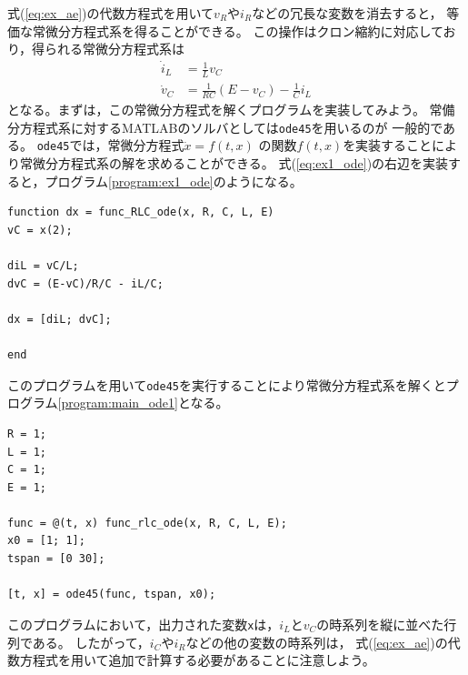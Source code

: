 \documentclass[tombow,dvipdfmx]{corona-a5-1.1}
\begin{document}
{\begin{例}[簡単な微分代数方程式の数値解法]
式(\ref{eq:ex_ae})の代数方程式を用いて$v_R$や$i_R$などの冗長な変数を消去すると，
等価な常微分方程式系を得ることができる。
この操作はクロン縮約に対応しており，得られる常微分方程式系は
\begin{subequations}\label{eq:ex1_ode}
  \begin{align}
    \dot{i}_L & = \frac{1}{L}v_C                     \\
    \dot{v}_C & = \frac{1}{RC}(E-v_C)-\frac{1}{C}i_L
  \end{align}
\end{subequations}
となる。まずは，この常微分方程式を解くプログラムを実装してみよう。
常備分方程式系に対するMATLABのソルバとしては\verb|ode45|を用いるのが
一般的である。
\verb|ode45|では，常微分方程式$\dot{x} = f(t, x)$
の関数$f(t, x)$を実装することにより常微分方程式系の解を求めることができる。
式(\ref{eq:ex1_ode})の右辺を実装すると，プログラム\ref{program:ex1_ode}のようになる。
\begin{PROGRAMA}[count,title={func\_RLC\_ode.m}]\label{program:ex1_ode}
  \begin{verbatim}
function dx = func_RLC_ode(x, R, C, L, E)
vC = x(2);

diL = vC/L;
dvC = (E-vC)/R/C - iL/C;

dx = [diL; dvC];

end
\end{verbatim}
\end{PROGRAMA}



このプログラムを用いて\verb|ode45|を実行することにより常微分方程式系を解くとプログラム\ref{program:main_ode1}となる。

\begin{PROGRAMA}[count,title={main\_RLC\_ode.m}]\label{program:main_ode1}
  \begin{verbatim}
R = 1;
L = 1;
C = 1;
E = 1;

func = @(t, x) func_rlc_ode(x, R, C, L, E);
x0 = [1; 1];
tspan = [0 30];

[t, x] = ode45(func, tspan, x0);
\end{verbatim}
\end{PROGRAMA}


このプログラムにおいて，出力された変数\verb|x|は，$i_L$と$v_C$の時系列を縦に並べた行列である。
したがって，$i_C$や$i_R$などの他の変数の時系列は，
式(\ref{eq:ex_ae})の代数方程式を用いて追加で計算する必要があることに注意しよう。


\end{例}}
\end{document}
